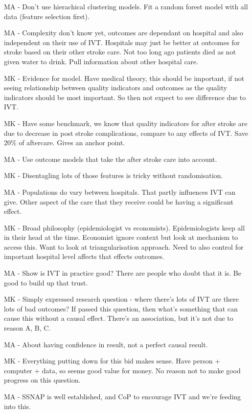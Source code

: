 MA - Don't use hierachical clustering models. Fit a random forest model with all data (feature selection first).

MA - Complexity don't know yet, outcomes are dependant on hospital and also independent on their use of IVT. Hospitals may just be better at outcomes for stroke based on their other stroke care. Not too long ago patients died as not given water to drink. Pull information about other hospital care.

MK - Evidence for model. Have medical theory, this should be important, if not seeing relationship between quality indicators and outcomes as the quality indicators should be most important. So then not expect to see difference due to IVT.

MK - Have some benchmark, we know that quality indicators for after stroke are due to decrease in post stroke complications, compare to any effects of IVT. Save 20\% of aftercare. Gives an anchor point.

MA - Use outcome models that take the after stroke care into account.

MK - Disentagling lots of those features is tricky without randomisation.

MA - Populations do vary between hospitals. That partly influences IVT can give. Other aspect of the care that they receive could be having a significant effect.

MK - Broad philosophy (epidemiologist vs economists). Epidemiologists keep all in their head at the time. Economist ignore context but look at mechanism to access this.
Want to look at triangularisation approach.
Need to also control for important hospital level affects that effects outcomes.

MA - Show is IVT in practice good? There are people who doubt that it is. Be good to build up that trust.

MK - Simply expressed research question - where there's lots of IVT are there lots of bad outcomes? If passed this question, then what's something that can cause this without a causal effect. There's an association, but it's not due to reason A, B, C.

MA - About having confidence in result, not a perfect causal result.

MK - Everything putting down for this bid makes sense. Have person + computer + data, so seems good value for money. No reason not to make good progress on this question.

MA - SSNAP is well established, and CoP to encourage IVT and we're feeding into this.

